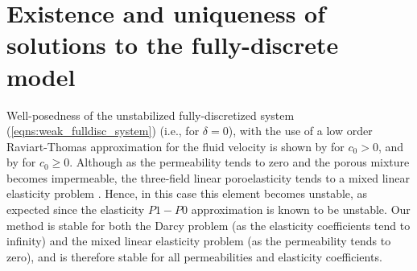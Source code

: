 \section{Existence and uniqueness of solutions to the fully-discrete model}
\label{sec:stability}
\label{sec:existence_uniqueness}


Well-posedness of the unstabilized fully-discretized system (\ref{eqns:weak_fulldisc_system}) (i.e., for $\delta=0$), with the use of a low order Raviart-Thomas approximation for the fluid velocity is shown by \cite{phillips2007couplingtwo} for $c_{0}>0$, and by \cite{lipnikov2002numerical} for $c_{0} \geq 0$.
Although as the permeability tends to zero and the porous mixture becomes impermeable, the three-field linear poroelasticity tends to a mixed linear elasticity problem \cite{haga2012causes}. Hence, in this case this element becomes unstable, as expected since the elasticity $P1-P0$ approximation is known to be unstable.
Our method is stable for both the Darcy problem (as the elasticity coefficients tend to infinity) and the mixed linear elasticity problem (as the permeability tends to zero), and  is therefore stable for all permeabilities and elasticity coefficients.




